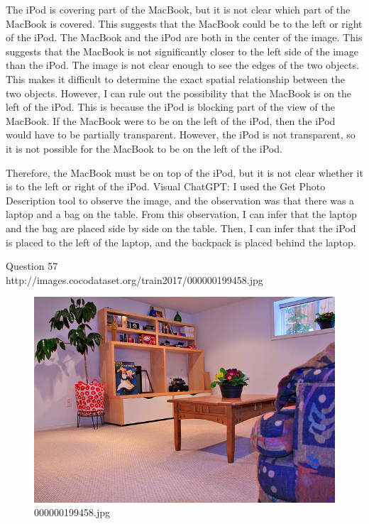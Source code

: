 \begin{enumerate}
    The iPod is covering part of the MacBook, but it is not clear which part of the MacBook is covered. This suggests that the MacBook could be to the left or right of the iPod.
    The MacBook and the iPod are both in the center of the image. This suggests that the MacBook is not significantly closer to the left side of the image than the iPod.
    The image is not clear enough to see the edges of the two objects. This makes it difficult to determine the exact spatial relationship between the two objects.
    However, I can rule out the possibility that the MacBook is on the left of the iPod. This is because the iPod is blocking part of the view of the MacBook. If the MacBook were to be on the left of the iPod, then the iPod would have to be partially transparent. However, the iPod is not transparent, so it is not possible for the MacBook to be on the left of the iPod.
    
    Therefore, the MacBook must be on top of the iPod, but it is not clear whether it is to the left or right of the iPod.
    \subitem Visual ChatGPT: I used the Get Photo Description tool to observe the image, and the observation was that there was a laptop and a bag on the table. From this observation, I can infer that the laptop and the bag are placed side by side on the table. Then, I can infer that the iPod is placed to the left of the laptop, and the backpack is placed behind the laptop.
\end{enumerate}
Question 57\\
http://images.cocodataset.org/train2017/000000199458.jpg
\begin{figure}[h]
    \centering
    \includegraphics[width=0.8\linewidth]{../image set/hard/000000199458.jpg}
    \caption{000000199458.jpg}
\end{figure}
